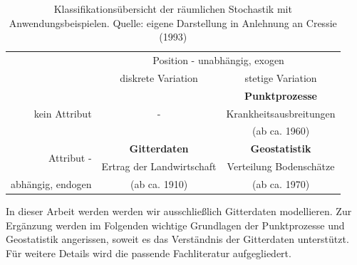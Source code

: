 \begin{table}[h!]
    \begin{center}
    \begin{tabular}{|r|c|c|}
    \hline
            & \multicolumn{2}{|c|}{\sc Position - unabhängig, exogen} \\
            \cline{2-3}
            & {\sc diskrete Variation}  & {\sc stetige Variation} \\
    \hline
    \multirow{3}{*}{\sc kein Attribut}  &    \multirow{3}{*}{-}    & \textbf{Punktprozesse} \\
            &                   & Krankheitsausbreitungen \\
            &                   & (ab ca. 1960) \\
    \hline
    \multirow{2}{*}{\sc Attribut -} & \textbf{Gitterdaten} & \textbf{Geostatistik} \\    
              & Ertrag der Landwirtschaft & Verteilung Bodenschätze \\
    {\sc abhängig, endogen}   & (ab ca. 1910) & (ab ca. 1970) \\
    \hline
    \end{tabular}
    \end{center}
    \caption{Klassifikationsübersicht der räumlichen Stochastik mit Anwendungsbeispielen. Quelle: eigene Darstellung in Anlehnung an Cressie (1993)}
    \label{table_main-classes}
\end{table}
In dieser Arbeit werden werden wir ausschließlich Gitterdaten modellieren. 
Zur Ergänzung werden im Folgenden wichtige Grundlagen der Punktprozesse und Geostatistik angerissen, 
soweit es das Verständnis der Gitterdaten unterstützt. Für weitere Details wird die passende Fachliteratur aufgegliedert.

